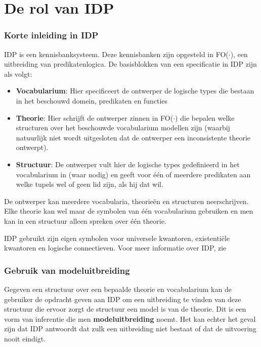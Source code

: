 \chapter{De rol van IDP}\label{sec:rol-idp}
\subsection{Korte inleiding in IDP}
IDP is een kennisbanksysteem. Deze kennisbanken zijn opgesteld in FO($\cdot$), een uitbreiding van predikatenlogica. De basisblokken van een specificatie in IDP zijn als volgt:

\begin{itemize}
	\item \textbf{Vocabularium}: Hier specificeert de ontwerper de logische types die bestaan in het beschouwd domein, predikaten en functies
	\item \textbf{Theorie}: Hier schrijft de ontwerper zinnen in FO($\cdot$) die bepalen welke structuren over het beschouwde vocabularium modellen zijn (waarbij natuurlijk niet wordt uitgesloten dat de ontwerper een inconsistente theorie ontwerpt).
	\item \textbf{Structuur}: De ontwerper vult hier de logische types gedefinieerd in het vocabularium in (waar nodig) en geeft voor \'e\'en of meerdere predikaten aan welke tupels wel of geen lid zijn, als hij dat wil.
\end{itemize}

De ontwerper kan meerdere vocabularia, theorie\"en en structuren neerschrijven. Elke theorie kan wel maar de symbolen van \'e\'en vocabularium gebruiken en men kan in een structuur alleen spreken over \'e\'en theorie.

IDP gebruikt zijn eigen symbolen voor universele kwantoren, existenti\"ele kwantoren en logische connectieven. Voor meer informatie over IDP, zie 

\subsection{Gebruik van modeluitbreiding}
Gegeven een structuur over een bepaalde theorie en vocabularium kan de gebruiker de opdracht geven aan IDP om een uitbreiding te vinden van deze structuur die ervoor zorgt de structuur een model is van de theorie. Dit is een vorm van inferentie die men \textbf{modeluitbreiding} noemt. Het kan echter het geval zijn dat IDP antwoordt dat zulk een uitbreiding niet bestaat of dat de uitvoering nooit eindigt.


